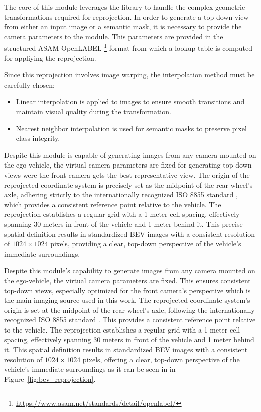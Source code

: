 The core of this module leverages the  library \cite{VCD} to handle the complex geometric transformations required for reprojection. In order to generate a top-down view from either an input image or a semantic mask, it is necessary to provide the camera parameters to the module. This parameters are provided in the structured ASAM OpenLABEL \footnote{\url{https://www.asam.net/standards/detail/openlabel/}} format from which a lookup table is computed for appliying the  reprojection.

Since this reprojection involves image warping, the interpolation method must be carefully chosen:
\begin{itemize}
    \item Linear interpolation is applied to images to ensure smooth transitions and maintain visual quality during the transformation.
    \item Nearest neighbor interpolation is used for semantic masks to preserve pixel class integrity. 
\end{itemize}

Despite this module is capable of generating  images from any camera mounted on the ego-vehicle, the virtual  camera parameters are fixed for generating top-down views were the front camera gets the best representative view. The origin of the reprojected coordinate system is precisely set as the midpoint of the rear wheel's axle, adhering strictly to the internationally recognized ISO 8855 standard \cite{ISO8855}, which provides a consistent reference point relative to the vehicle. The reprojection establishes a regular grid with a 1-meter cell spacing, effectively spanning 30 meters in front of the vehicle and 1 meter behind it. This precise spatial definition results in standardized BEV images with a consistent resolution of $1024 \times 1024$ pixels, providing a clear, top-down perspective of the vehicle's immediate surroundings.

Despite this module's capability to generate  images from any camera mounted on the ego-vehicle, the virtual  camera parameters are fixed. This ensures consistent top-down views, especially optimized for the front camera's perspective which is the main imaging source used in this work. The reprojected coordinate system's origin is set at the midpoint of the rear wheel's axle, following the internationally recognized ISO 8855 standard \cite{ISO8855}. This provides a consistent reference point relative to the vehicle. The reprojection establishes a regular grid with a 1-meter cell spacing, effectively spanning 30 meters in front of the vehicle and 1 meter behind it. This spatial definition results in standardized BEV images with a consistent resolution of $1024 \times 1024$ pixels, offering a clear, top-down perspective of the vehicle's immediate surroundings as it can be seen in in Figure~\ref{fig:bev_reprojection}.

